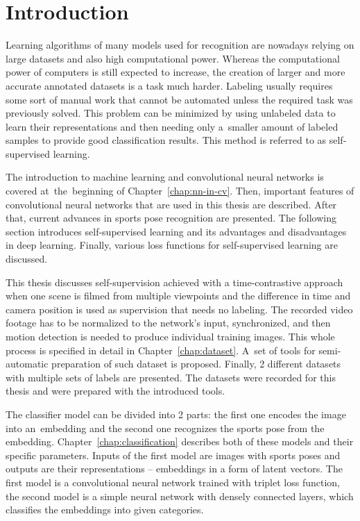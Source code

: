 \chapter{\label{chap:intro}Introduction}

Learning algorithms of many models used for recognition are nowadays relying on large datasets and also high computational power. Whereas the computational power of computers is still expected to increase, the creation of larger and more accurate annotated datasets is a task much harder. Labeling usually requires some sort of manual work that cannot be automated unless the required task was previously solved. This problem can be minimized by using unlabeled data to learn their representations and then needing only a~smaller amount of labeled samples to provide good classification results. This method is referred to as self-supervised learning.

The introduction to machine learning and convolutional neural networks is covered at~the~beginning of Chapter~\ref{chap:nn-in-cv}. Then, important features of convolutional neural networks that are used in this thesis are described. After that, current advances in sports pose recognition are presented. The following section introduces self-supervised learning and its advantages and disadvantages in deep learning. Finally, various loss functions for self-supervised learning are discussed.

This thesis discusses self-supervision achieved with a time-contrastive approach when one scene is filmed from multiple viewpoints and the difference in time and camera position is used as supervision that needs no labeling. The recorded video footage has to be normalized to the network's input, synchronized, and then motion detection is needed to produce individual training images. This whole process is specified in detail in Chapter~\ref{chap:dataset}. A~set of tools for semi-automatic preparation of such dataset is proposed. Finally, 2 different datasets with multiple sets of labels are presented. The datasets were recorded for this thesis and were prepared with the introduced tools.

The classifier model can be divided into 2 parts: the first one encodes the image into an~embedding and the second one recognizes the sports pose from the embedding. Chapter~\ref{chap:classification} describes both of these models and their specific parameters. Inputs of the first model are images with sports poses and outputs are their representations -- embeddings in a form of latent vectors. The first model is a convolutional neural network trained with triplet loss function, the second model is a simple neural network with densely connected layers, which classifies the embeddings into given categories.

